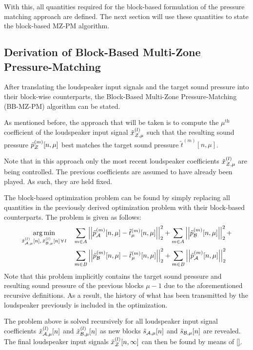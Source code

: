 With this,  all quantities required for the block-based formulation of the pressure matching approach are defined.
The next section will use these quantities to state the block-based MZ-PM algorithm.

\subsection{Derivation of Block-Based Multi-Zone Pressure-Matching}
After translating the loudspeaker input signals and the target sound pressure into their block-wise counterparts, 
the Block-Based Multi-Zone Pressure-Matching (BB-MZ-PM) algorithm can be stated.

As mentioned before, the approach that will be taken is to compute the $\mu^\text{th}$ coefficient of the loudspeaker input signal
$\tilde{x}^{(l)}_{\mathcal{Z},\mu}$ such that the resulting sound pressure $\tilde{p}_{\mathcal{Z}}^{(m)}[n, \mu]$ best matches the target sound pressure 
$\tilde{t}^{(m)}[n, \mu]$. 

Note that in this approach only the most recent loudspeaker coefficients $\tilde{x}^{(l)}_{\mathcal{Z},\mu}$ are being controlled. 
The previous coefficients are assumed to have already been played.
As such, they are held fixed.

The block-based optimization problem can be found by simply replacing all quantities in the previously derived optimization problem
with their block-based counterparts.
The problem is given as follows:
\begin{align}
    \argmin{\tilde{x}_{\za,\mu}^{(l)}[n],\,\tilde{x}_{\zb,\mu}^{(l)}[n]\,\forall\,l}{
       &\sum_{m\in A} \norm[2][2]{\tilde{p}_{\za}^{(m)}[n,\mu] - \tilde{t}_\mu^{(m)}[n,\mu]} +
       \sum_{m\in A} \norm[2][2]{\tilde{p}_{\zb}^{(m)}[n,\mu]} + \\
       &\sum_{m\in B} \norm[2][2]{\tilde{p}_{\zb}^{(m)}[n,\mu] - \tilde{t}_\mu^{(m)}[n,\mu]} + 
       \sum_{m\in B} \norm[2][2]{\tilde{p}_{\za}^{(m)}[n,\mu]}
    }
\end{align}
Note that this problem implicitly contains the target sound pressure and resulting sound pressure of the previous blocks $\mu - 1$ due to
the aforementioned recursive definitions.
As a result, the history of what has been transmitted by the loudspeaker previously is included in the optimization.

The problem above is solved recursively for all loudspeaker input signal coefficients $\tilde{x}_{\mathcal{A},\mu}^{(l)}[n]$ and $\tilde{x}_{\mathcal{B},\mu}^{(l)}[n]$
as new blocks $\tilde{s}_{\mathcal{A},\mu}[n]$ and $\tilde{s}_{\mathcal{B},\mu}[n]$ are revealed.
The final loudspeaker input signals $\tilde{x}_{\mathcal{Z}}^{(l)}[n, \infty]$  can then be found by means of \autoref{}.

